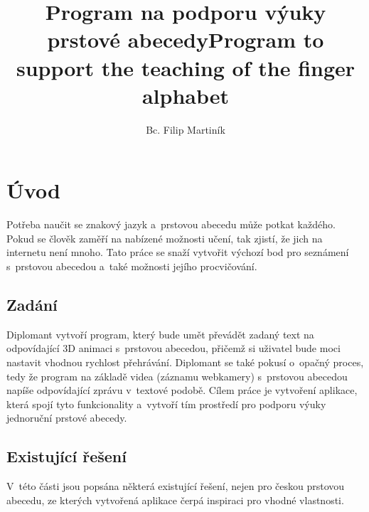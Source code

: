 \documentclass[
  master,
  program=ainfvs,
  biblatex,
  figures=true,
  tables=false,
  sourcecodes=true,
  glossaries,
  index
]{kidiplom}
\title{Program na podporu výuky prstové abecedy}
\title[english]{Program to support the teaching of the finger alphabet}
\author{Bc. Filip Martiník}
\begin{document}
\maketitle

\clearpage
\section{Úvod}
     Potřeba naučit se znakový jazyk a~prstovou abecedu může potkat každého. Pokud se člověk zaměří na nabízené možnosti učení, tak zjistí, že jich na internetu není mnoho. Tato práce se snaží vytvořit výchozí bod pro seznámení s~prstovou abecedou a~také možnosti jejího procvičování.

    \subsection{Zadání}
        Diplomant vytvoří program, který bude umět převádět zadaný text na odpovídající 3D animaci s~prstovou abecedou, přičemž si uživatel bude moci nastavit vhodnou rychlost přehrávání. Diplomant se také pokusí o~opačný proces, tedy že program na základě videa (záznamu webkamery) s~prstovou abecedou napíše odpovídající zprávu v~textové podobě. Cílem práce je vytvoření aplikace, která spojí tyto funkcionality a~vytvoří tím prostředí pro podporu výuky jednoruční prstové abecedy.


    \subsection{Existující řešení}
        V~této části jsou popsána některá existující řešení, nejen pro českou prstovou abecedu, ze kterých vytvořená aplikace čerpá inspiraci pro vhodné vlastnosti.
            
\end{document}

